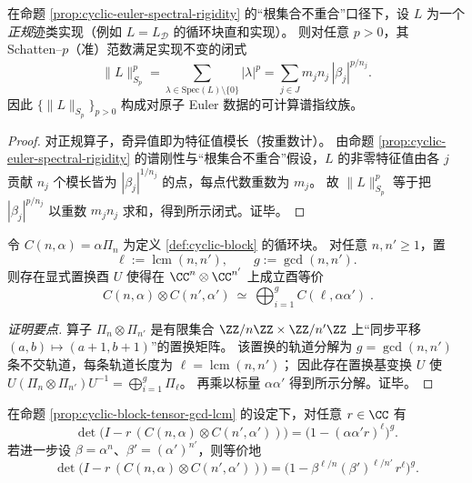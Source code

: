 \begin{corollary}\label{cor:cyclic-euler-schatten-invariants}
在命题 \ref{prop:cyclic-euler-spectral-rigidity} 的“根集合不重合”口径下，设 \(L\) 为一个\emph{正规}迹类实现（例如 \(L=L_{\mathcal D}\) 的循环块直和实现）。
则对任意 \(p>0\)，其 Schatten--\(p\)（准）范数满足实现不变的闭式
\[
\|L\|_{S_p}^{p}
=\sum_{\lambda\in\mathrm{Spec}(L)\setminus\{0\}}|\lambda|^{p}
=\sum_{j\in J} m_j n_j\,|\beta_j|^{p/n_j}.
\]
因此 \(\{\|L\|_{S_p}\}_{p>0}\) 构成对原子 Euler 数据的可计算谱指纹族。
\end{corollary}

\begin{proof}
对正规算子，奇异值即为特征值模长（按重数计）。
由命题 \ref{prop:cyclic-euler-spectral-rigidity} 的谱刚性与“根集合不重合”假设，\(L\) 的非零特征值由各 \(j\) 贡献 \(n_j\) 个模长皆为 \(|\beta_j|^{1/n_j}\) 的点，每点代数重数为 \(m_j\)。
故 \(\|L\|_{S_p}^p\) 等于把 \(|\beta_j|^{p/n_j}\) 以重数 \(m_jn_j\) 求和，得到所示闭式。证毕。
\end{proof}

\begin{proposition}\label{prop:cyclic-block-tensor-gcd-lcm}
令 \(C(n,\alpha)=\alpha\Pi_n\) 为定义 \ref{def:cyclic-block} 的循环块。
对任意 \(n,n'\ge 1\)，置
\[
\ell:=\operatorname{lcm}(n,n'),\qquad g:=\gcd(n,n').
\]
则存在显式置换酉 \(U\) 使得在 \(\CC^{n}\otimes\CC^{n'}\) 上成立酉等价
\[
\boxed{\;
C(n,\alpha)\otimes C(n',\alpha')\ \simeq\
\bigoplus_{i=1}^{g} C(\ell,\alpha\alpha')\; }.
\]
\end{proposition}

\begin{proof}[证明要点]
算子 \(\Pi_n\otimes\Pi_{n'}\) 是有限集合 \(\ZZ/n\ZZ\times\ZZ/n'\ZZ\) 上“同步平移 \((a,b)\mapsto(a+1,b+1)\)”的置换矩阵。
该置换的轨道分解为 \(g=\gcd(n,n')\) 条不交轨道，每条轨道长度为 \(\ell=\operatorname{lcm}(n,n')\)；
因此存在置换基变换 \(U\) 使
\(
U(\Pi_n\otimes\Pi_{n'})U^{-1}=\bigoplus_{i=1}^{g}\Pi_{\ell}
\)。
再乘以标量 \(\alpha\alpha'\) 得到所示分解。证毕。
\end{proof}

\begin{corollary}[张量积因子的行列式闭式]\label{cor:cyclic-block-tensor-determinant}
在命题 \ref{prop:cyclic-block-tensor-gcd-lcm} 的设定下，对任意 \(r\in\CC\) 有
\[
\det\!\bigl(I-r\,(C(n,\alpha)\otimes C(n',\alpha'))\bigr)
=\bigl(1-(\alpha\alpha' r)^{\ell}\bigr)^{g}.
\]
若进一步设 \(\beta=\alpha^n\)、\(\beta'=(\alpha')^{n'}\)，则等价地
\[
\det\!\bigl(I-r\,(C(n,\alpha)\otimes C(n',\alpha'))\bigr)
=\bigl(1-\beta^{\ell/n}(\beta')^{\ell/n'}\,r^{\ell}\bigr)^{g}.
\]
\end{corollary}

